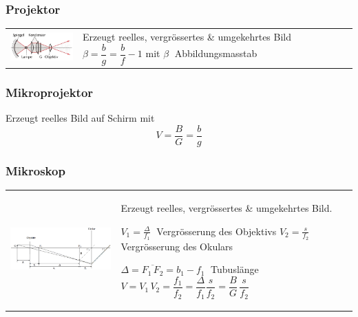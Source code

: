 \begin{minipage}{12cm}
\subsubsection{Projektor }
\begin{tabular}{ll}
\parbox{4cm}{
  \includegraphics[width=4cm]{./bilder/projektor.png}} &
\parbox{6.5cm}{
  Erzeugt reelles, vergrössertes \& umgekehrtes Bild \\
  $\beta = \dfrac{b}{g} = \dfrac{b}{f}-1$ mit $\beta \;$ Abbildungsmasstab}
\end{tabular}
\end{minipage}
\begin{minipage}{6cm}
	\subsubsection{Mikroprojektor} 
		Erzeugt reelles Bild auf Schirm mit \[V=\dfrac{B}{G}=\dfrac{b}{g}\]
\end{minipage}

\subsubsection{Mikroskop  }
\begin{tabular}{ll}
  \parbox{8cm}{
    \includegraphics[width=7cm]{./bilder/mikroskop.png}} &
  \parbox{10cm}{
    Erzeugt reelles, vergrössertes \& umgekehrtes Bild. \\
    \hspace*{1cm}\parbox{9cm}{
    $V_1 = \frac{\Delta}{f_1} \;$ Vergrösserung des Objektivs\\
    $V_2 = \frac{s}{f_2} \;$ Vergrösserung des Okulars \\
    \\
    $\Delta = \overline{F_1\,F_2} = b_1 - f_1 \;$ Tubuslänge \\
    $V=V_1\,V_2= \dfrac{f_1}{f_2} = \dfrac{\Delta}{f_1} \dfrac{s}{f_2} =
    \dfrac{B}{G} \, \dfrac{s}{f_2}$ }}
\end{tabular}

